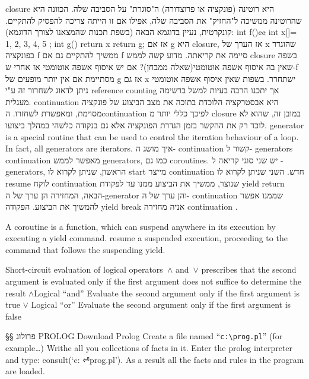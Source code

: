 \begin{טבלא}[!htbp]
        closure היא רוטינה (פונקציה או פרוצדורה) ה"סוגרת" על הסביבה שלה. הכוונה היא שהרוטינה ממשיכה ל"החזיק" את הסביבה שלה, אפילו אם זו הייתה צריכה להפסיק להתקיים. קונקרטית, נעיין בדוגמא הבאה (בשפת תכנות שהמצאנו לצורך הדוגמא):
        int f(){¢¢
          int x[]={ 1, 2, 3, 4, 5 };
          int g(){ return x }
          return g;
        }
        אז אם g היא closure, אז הערך של x שהוגדר בפונקציה f ממשיך להתקיים גם אם f סיימה את קריאתה.
        מדוע קשה לממש closure בשפה שאין בה איסוף אשפה אוטומטי(שאלה ממבחן)?
        אם יש איסוף אשפה אוטומטי אז אחרי ש-f מסתיימת אם אין יותר מופעים של g אז גם x ישתחרר. בשפות שאין איסוף אשפה אוטומטי ניתן לדאוג לשחרור זה ע"י
        reference counting אך יתכנו הרבה בעיות למשל ברשימה מעגלית.
        continuation היא אבסטרקציה הלוכדת בתוכה את מצב הביצוע של פונקציה מסוימת,
        ומאפשרת לשחזרו. הcontinuation לפיכך כללי יותר מ closure במובן זה, שהוא לא לוכד רק את ההקשר בזמן הגדרת הפונקציה אלא גם בנקודה כלשהי במהלך ביצועו.
        generator is a special routine that can be used to control the iteration behaviour of a loop. In fact, all generators are iterators.
        איך מושג ה- continuation קשור ל- generators
        continuation מאפשר לממש generators, כמו גם coroutines. יש שני סוגי קריאה ל - generators, הראשון, שניתן לקרוא לו start מייצר continuation חדש. השני שניתן לקרוא לו resume לוקח continuation שנוצר, ממשיך את הביצוע ממנו עד לפקודת yield return הבאה, המחזירה הן ערך של ה-generator והן ערך של ה- continuation שממנו אפשר להמשיך את הביצוע. הפקודה yield break אניה מחזירה continuation .

        A coroutine is a function, which can suspend anywhere in its execution by executing a yield command. resume a suspended execution, proceeding to the command that follows the suspending yield.

        Short-circuit evaluation of logical operators~$∧$ and~$∨$ prescribes that
        the second argument is evaluated only if the first argument does not
        suffice to determine the result
        $∧$Logical “and” Evaluate the second argument only if the first
        argument is true
        $∨$ Logical “or” Evaluate the second argument only if the first
        argument is false

        §§ פרולוג
        PROLOG
        Download Prolog
        Create a file named “\verb+c:\prog.pl+” (for example…)
        Writhe all you collections of facts in it.
        Enter the prolog interpreter and type: consult(‘c: ⏎prog.pl’).
        As a result all the facts and rules in the program are loaded.


\end{טבלא}
